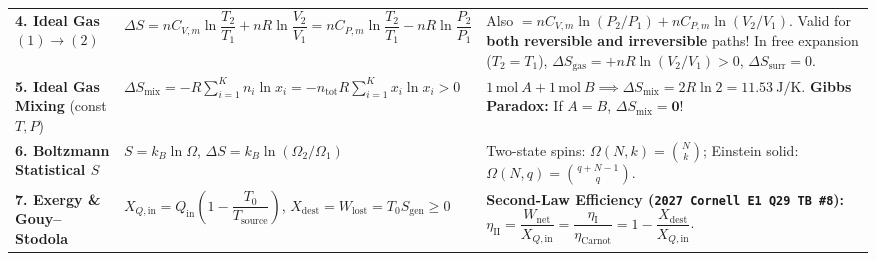 \documentclass[10pt,twoside,openany,letterpaper]{book}
\begin{document}
\begin{quicksheet}
\begin{formulacard}
\begin{tabularx}{\linewidth}{@{}l l X@{}}
\textbf{4. Ideal Gas} $(1)\to(2)$ & $\Delta S = nC_{V,m}\ln\dfrac{T_2}{T_1} + nR\ln\dfrac{V_2}{V_1} = nC_{P,m}\ln\dfrac{T_2}{T_1} - nR\ln\dfrac{P_2}{P_1}$ & Also $= nC_{V,m}\ln(P_2/P_1) + nC_{P,m}\ln(V_2/V_1)$. Valid for \textbf{both reversible and irreversible} paths! In free expansion ($T_2=T_1$), $\Delta S_{\mathrm{gas}} = +nR\ln(V_2/V_1) > 0$, $\Delta S_{\mathrm{surr}} = 0$. \\
\textbf{5. Ideal Gas Mixing} (const $T,P$) & $\Delta S_{\mathrm{mix}} = -R\sum_{i=1}^K n_i\ln x_i = -n_{\mathrm{tot}}R\sum_{i=1}^K x_i\ln x_i > 0$ & $1\,\si{\mole}\ A + 1\,\si{\mole}\ B \implies \Delta S_{\mathrm{mix}} = 2R\ln 2 = \SI{11.53}{\joule\per\kelvin}$. \textbf{Gibbs Paradox:} If $A=B$, $\Delta S_{\mathrm{mix}}=\mathbf{0}$! \\
\textbf{6. Boltzmann Statistical $S$} & $S = k_B\ln\Omega$, \quad $\Delta S = k_B\ln(\Omega_2/\Omega_1)$ & Two-state spins: $\Omega(N,k)=\binom{N}{k}$; Einstein solid: $\Omega(N,q)=\binom{q+N-1}{q}$. \\
\textbf{7. Exergy \& Gouy--Stodola} & $X_{Q,\mathrm{in}} = Q_{\mathrm{in}}\left(1 - \dfrac{T_0}{T_{\mathrm{source}}}\right)$, \quad $\boxed{X_{\mathrm{dest}} = W_{\mathrm{lost}} = T_0 S_{\mathrm{gen}} \ge 0}$ & \textbf{Second-Law Efficiency (\texttt{2027 Cornell E1 Q29 TB~\#8}):} $\boxed{\eta_{\mathrm{II}} = \dfrac{W_{\mathrm{net}}}{X_{Q,\mathrm{in}}} = \dfrac{\eta_{\mathrm{I}}}{\eta_{\mathrm{Carnot}}} = 1 - \dfrac{X_{\mathrm{dest}}}{X_{Q,\mathrm{in}}}}$. \\
\bottomrule
\end{tabularx}
\end{formulacard}


\end{quicksheet}
\end{document}
